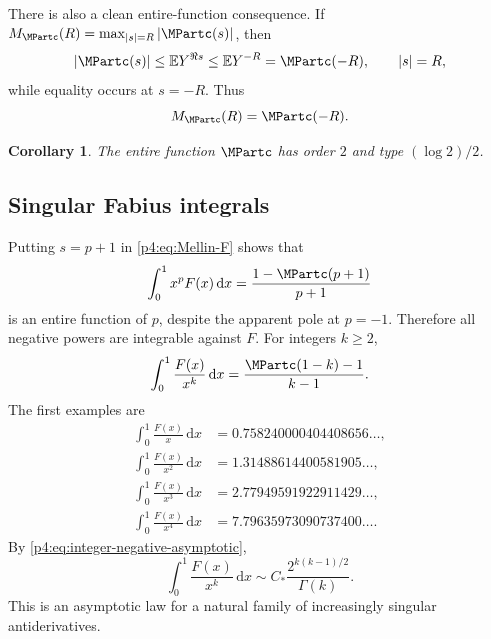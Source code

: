 \documentclass[11pt,oneside]{article}
\newtheorem{corollary}[theorem]{Corollary}
\theoremstyle{definition}
\theoremstyle{remark}
\newcommand{\F}{F}
\newcommand{\E}{\mathbb E}
\newcommand{\dd}{\,\mathrm d}
\newcommand{\1}{\mathbf 1}
\begin{document}
There is also a clean entire-function consequence.  If
\(M_{\MPartc}(R)=\max_{|s|=R}|\MPartc(s)|\), then
\begin{equation}\label{p4:eq:maxmod-equality}
 |\MPartc(s)|\le\E Y^{\Re s}\le\E Y^{-R}=\MPartc(-R),
 \qquad |s|=R,
\end{equation}
while equality occurs at \(s=-R\).  Thus
\begin{equation}\label{p4:eq:maxmod-exact}
 M_{\MPartc}(R)=\MPartc(-R).
\end{equation}

\begin{corollary}\label{p4:cor:order-type}
The entire function \(\MPartc\) has order \(2\) and type \((\log2)/2\).
\end{corollary}

\subsection{Singular Fabius integrals}

Putting \(s=p+1\) in \cref{p4:eq:Mellin-F} shows that
\begin{equation}\label{p4:eq:weighted-F-complete}
 \int_0^1x^p\F(x)\dd x
 =\frac{1-\MPartc(p+1)}{p+1}
\end{equation}
is an entire function of \(p\), despite the apparent pole at \(p=-1\).  Therefore
all negative powers are integrable against \(\F\).  For integers \(k\ge2\),
\begin{equation}\label{p4:eq:singular-F-integers}
 \int_0^1\frac{\F(x)}{x^k}\dd x
 =\frac{\MPartc(1-k)-1}{k-1}.
\end{equation}
The first examples are
\begin{align}
 \int_0^1\frac{\F(x)}{x}\dd x
 &=0.758240000404408656\ldots,\nonumber\\
 \int_0^1\frac{\F(x)}{x^2}\dd x
 &=1.31488614400581905\ldots,\nonumber\\
 \int_0^1\frac{\F(x)}{x^3}\dd x
 &=2.77949591922911429\ldots,\nonumber\\
 \int_0^1\frac{\F(x)}{x^4}\dd x
 &=7.79635973090737400\ldots.\label{p4:eq:singular-F-values}
\end{align}
By \cref{p4:eq:integer-negative-asymptotic},
\begin{equation}\label{p4:eq:singular-F-asymptotic}
 \int_0^1\frac{\F(x)}{x^k}\dd x
 \sim C_*\frac{2^{k(k-1)/2}}{\Gamma(k)}.
\end{equation}
This is an asymptotic law for a natural family of increasingly singular antiderivatives.
\end{document}

